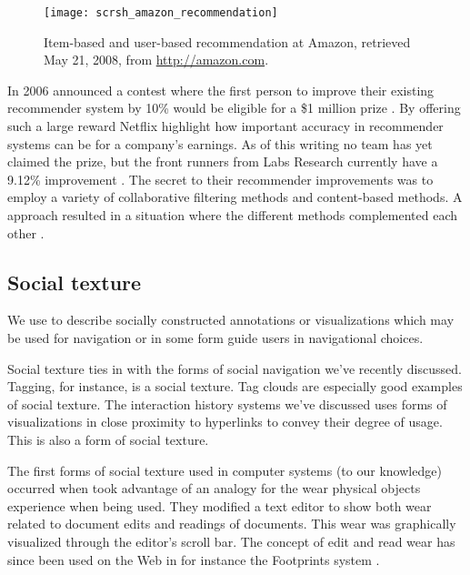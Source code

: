 \begin{figure}
  \texttt{[image: scrsh\_amazon\_recommendation]}
  \caption[Recommendations at Amazon]{
    Item-based and user-based recommendation at Amazon,
    retrieved May 21, 2008, from
    \url{http://amazon.com}.
  }
  \label{figure:scrsh.amazon.recommendation}
\end{figure}

In 2006 %
announced a contest where the first person to improve their existing
recommender system by 10\% would be eligible for a \$1 million prize
\citep[]{segaran07}. By offering such a large reward Netflix
highlight how important accuracy in recommender systems can be for a company's
earnings. As of this writing no team has yet claimed the prize, but the front
runners from  Labs Research currently have a 9.12\% improvement
\citep{netflix08}. The secret to their recommender improvements was to employ
a variety of collaborative filtering methods and content-based methods.
A approach resulted in a situation where the different methods
complemented each other \citep[]{bell07}.

\subsection{Social texture}

We use  to describe socially constructed annotations or
visualizations which may be used for navigation or in some form guide
users in navigational choices.

Social texture ties in with the forms of social navigation we've
recently discussed. Tagging, for instance, is a social texture. Tag clouds are
especially good examples of social texture.
The interaction history systems we've discussed uses forms of visualizations
in close proximity to hyperlinks to convey their degree of usage. This is also
a form of social texture.

The first forms of social texture used in computer systems (to our knowledge)
occurred when \citet{hill92} took advantage of
\dash{}an analogy for the
wear physical objects experience when being used. They modified a text
editor to show both wear related to document edits and readings of documents.
This wear was graphically visualized through the editor's scroll bar.
The concept of edit and read wear has since been used on the Web in for
instance the Footprints system \citep{wexelblat99}.

